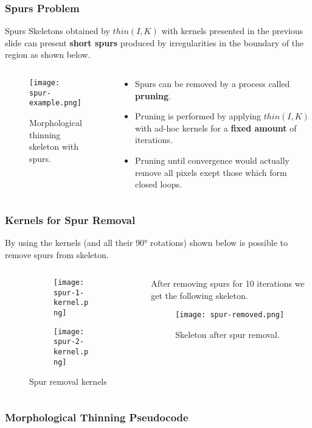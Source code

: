 \begin{frame}
  \frametitle{Spurs Problem}
  \begin{block}{Spurs}
    Skeletons obtained by $thin(I, K)$ with kernels presented in the previous slide can present \textbf{short spurs} produced by irregularities in the boundary of the region as shown below.
  \end{block}
  \begin{columns}
    \begin{column}{0.4\textwidth}
      \begin{figure}
        \texttt{[image: spur-example.png]}
        \caption{Morphological thinning skeleton with spurs.}
      \end{figure}
    \end{column}
    \begin{column}{0.6\textwidth}
      \begin{itemize}
        \item Spurs can be removed by a process called \textbf{pruning}.
        \item Pruning is performed by applying $thin(I, K)$ with ad-hoc kernels for a \textbf{fixed amount} of iterations.
        \item Pruning until convergence would actually remove all pixels exept those which form closed loops.
      \end{itemize}
    \end{column}
  \end{columns}
\end{frame}

\begin{frame}
  \frametitle{Kernels for Spur Removal}
  By using the kernels (and all their 90° rotations) shown below is possible to remove spurs from skeleton.
  \begin{columns}
    \begin{column}{0.5\textwidth}
      \begin{figure}
        \centering
        \begin{subfigure}[b]{0.5\textwidth}
          \centering
          \texttt{[image: spur-1-kernel.png]}
        \end{subfigure}
        \hfill
        \begin{subfigure}[b]{0.5\textwidth}
          \centering
          \texttt{[image: spur-2-kernel.png]}
        \end{subfigure}
        \caption{Spur removal kernels}
      \end{figure}
    \end{column}
    \begin{column}{0.5\textwidth}
      After removing spurs for 10 iterations we get the following skeleton.
      \begin{figure}
        \texttt{[image: spur-removed.png]}
        \caption{Skeleton after spur removal.}
      \end{figure}
    \end{column}
  \end{columns}
\end{frame}

\begin{frame}
  \frametitle{Morphological Thinning Pseudocode}
  
\end{frame}